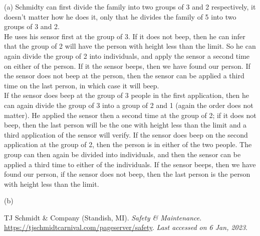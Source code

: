 \documentclass[a4paper]{exam}
\begin{document}
\begin{questions}
\begin{minipage}{.65\linewidth}
\end{minipage}
\begin{solution}
    (a) Schmidty can first divide the family into two groups of 3 and 2 respectively, it doesn't matter how he does it, only that he divides the family of 5 into two groups of 3 and 2. \\ 
    He uses his sensor first at the group of 3. If it does not beep, then he can infer that the group of 2 will have the person with height less than the limit. So he can again divide the group of 2 into individuals, and apply the sensor a second time on either of the person. If it the sensor beeps, then we have found our person. If the sensor does not beep at the person, then the sensor can be applied a third time on the last person, in which case it will beep. \\ 
    If the sensor does beep at the group of 3 people in the first application, then he can again divide the group of 3 into a group of 2 and 1 (again the order does not matter). He applied the sensor then a second time at the group of 2; if it does not beep, then the last person will be the one with height less than the limit and a third application of the sensor will verify. If the sensor does beep on the second application at the group of 2, then the person is in either of the two people. The group can then again be divided into individuals, and then the sensor can be applied a third time to either of the individuals. If the sensor beeps, then we have found our person, if the sensor does not beep, then the last person is the person with height less than the limit.
    
    (b) 
  \end{solution}
\end{questions}

\begin{thebibliography}{9}
  TJ Schmidt \& Company (Standish, MI). \emph{Safety \& Maintenance}. \url{https://tjschmidtcarnival.com/pageserver/safety}. \textit{Last accessed on 6 Jan, 2023}.
\end{thebibliography}
\end{document}
